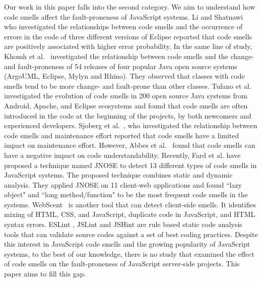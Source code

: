 Our work in this paper falls into the second category. We aim to understand how code smells affect the fault-proneness of JavaScript systems. Li and Shatnawi~\cite{shatnawi2006investigation} who investigated the relationships between code smells and the occurrence of errors in the code of three different versions of Eclipse reported that code smells are positively associated with higher error probability. In the same line of study, Khomh et al.~\cite{khomh2012exploratory} investigated the relationship between code smells and the change- and fault-proneness of 54 releases of four popular Java open source systems (ArgoUML, Eclipse, Mylyn and Rhino). They observed that classes with code smells tend to be more change- and fault-prone than other classes. Tufano et al. \cite{tufano2015and} investigated the evolution of code smells in 200 open source Java systems from Android, Apache, and Eclipse ecosystems and found that code smells are often introduced in the code at the beginning of the projects, by both newcomers and experienced developers. Sjoberg et al.~\cite{Sjoberg13QEC}, who investigated the relationship between code smells and maintenance effort reported that code smells have a limited impact on maintenance effort. However, Abbes et al.~\cite{Abbes11} found that code smells can have a negative impact on code understandability. Recently, Fard et al. \cite{fard2013jsnose} have proposed a technique named JNOSE to detect 13 different types of code smells in JavaScript systems. The proposed technique combines static and dynamic analysis. They applied JNOSE on 11 client-web applications and found ``lazy object" and ``long method/function" to be the most frequent code smells in the systems. WebScent~\cite{nguyen2012detection} is another tool that can detect client-side smells. It identifies mixing of HTML, CSS, and JavaScript, duplicate code in JavaScript, and HTML syntax errors. ESLint \cite{ESLint}, JSLint \cite{JslinT} and JSHint \cite{JSHint} are rule based static code analysis tools that can validate source codes against a set of best coding practices. Despite this interest in JavaScript code smells and the growing popularity of JavaScript systems, to the best of our knowledge, there is no study that examined the effect of code smells on the fault-proneness of JavaScript server-side projects. This paper aims to fill this gap. 


